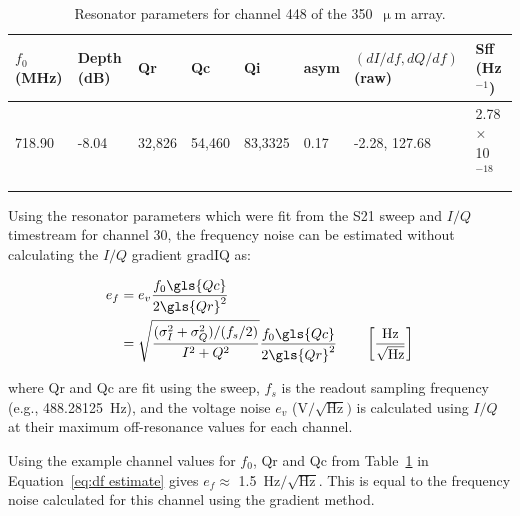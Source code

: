 \begin{figure}[ptbh]
\label{fig:example chan}
\end{figure}

\begin{table}[!htbp]
\centering
\begin{tabular}{@{}llllllll@{}}
\dtoprule{}
$f_{0}$ (MHz)   & Depth (dB) & \gls{Qr} & \gls{Qc} & \gls{Qi} & \gls{asym} & $(dI/df, dQ/df)$ (raw)  & \gls{Sff} (Hz$^{-1}$) \\ \midrule
718.90         & -8.04      & 32,826   & 54,460    & 83,3325   & 0.17  & -2.28, 127.68      & 2.78 $\times$ 10$^{-18}$    \\ \dbottomrule{}
\\
\end{tabular}
\caption[~Resonator parameters for channel 448 of the  array.]{Resonator parameters for channel 448 of the 350~$\upmu$m array.}
\label{table:350 example chan}
\end{table}

Using the resonator parameters which were fit from the \gls{S21} sweep and $I/Q$ timestream for channel 30, the frequency noise can be estimated without calculating the $I/Q$ gradient \gls{gradIQ} as:

\begin{equation}\label{eq:df estimate}
  \begin{aligned}
  e_{f} &= e_{v} \frac{f_{0} \gls{Qc} }{2 \gls{Qr}^{2}}\\
        &= \sqrt{ \frac{ (\sigma^{2}_{I} + \sigma^{2}_{Q}) / (f_{s}/2)}{ I^{2} + Q^{2} } } \frac{f_{0} \gls{Qc} }{2 \gls{Qr}^{2}} \qquad \left[  \frac{ \text{Hz} }{ \sqrt{\mathrm{Hz}} } \right]
  \end{aligned}
\end{equation}

where \gls{Qr} and \gls{Qc} are fit using the sweep, $f_{s}$ is the readout sampling frequency (e.g., 488.28125~Hz), and the voltage noise $e_{v}$ ($\mathrm{V}/\sqrt{\mathrm{Hz}})$ is calculated using $I/Q$ at their maximum off-resonance values for each channel.

Using the example channel values for $f_{0}$, \gls{Qr} and \gls{Qc} from Table~\ref{table:350 example chan} in Equation~\ref{eq:df estimate} gives $e_{f} \approx$ 1.5~$\mathrm{Hz}/\sqrt{\mathrm{Hz}}$. This is equal to the frequency noise calculated for this channel using the gradient method.

